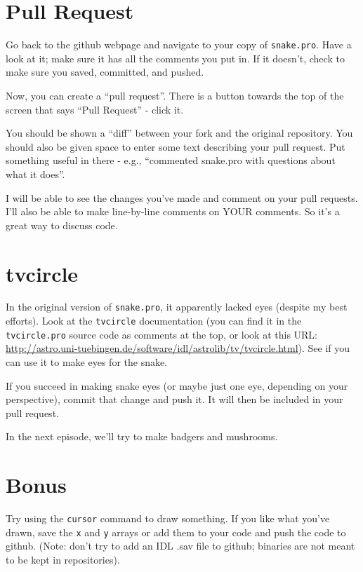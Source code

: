\documentclass{article}
\begin{document}
\begin{spacing}{1.0}
\section{Pull Request}
Go back to the github webpage and navigate to your copy of \verb|snake.pro|.  Have a
look at it; make sure it has all the comments you put in.  If it doesn't, check
to make sure you saved, committed, and pushed.

Now, you can create a ``pull request''.  There is a button towards the top of the
screen that says ``Pull Request'' - click it.

You should be shown a ``diff'' between your fork and the original repository.
You should also be given space to enter some text describing your pull request.
Put something useful in there - e.g., ``commented snake.pro with questions about
what it does''.

I will be able to see the changes you've made and comment on your pull requests.
I'll also be able to make line-by-line comments on YOUR comments.  So it's a
great way to discuss code.

\section{tvcircle}
In the original version of \texttt{snake.pro}, it apparently lacked eyes (despite
my best efforts).  Look at the \texttt{tvcircle} documentation (you can find it
in the \texttt{tvcircle.pro} source code as comments at the top, or look at this
URL: \url{http://astro.uni-tuebingen.de/software/idl/astrolib/tv/tvcircle.html}).
See if you can use it to make eyes for the snake.

If you succeed in making snake eyes (or maybe just one eye, depending on your
perspective), commit that change and push it.  It will then be included in your
pull request.

In the next episode, we'll try to make badgers and mushrooms.

\section{Bonus} 
Try using the \verb|cursor| command to draw something.  If you
like what you've drawn, save the \verb|x| and \verb|y| arrays or add them to
your code and push the code to github.  (Note: don't try to add an IDL .sav
file to github; binaries are not meant to be kept in repositories).

\end{spacing}
\end{document}
